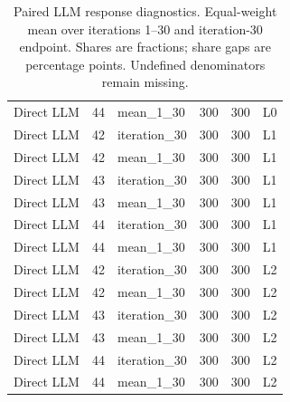 \begin{table}[htbp!]
\begin{tabular}{lrlrrl}
Direct LLM & 44 & mean\_1\_30 & 300 & 300 & L0 \\
Direct LLM & 42 & iteration\_30 & 300 & 300 & L1 \\
Direct LLM & 42 & mean\_1\_30 & 300 & 300 & L1 \\
Direct LLM & 43 & iteration\_30 & 300 & 300 & L1 \\
Direct LLM & 43 & mean\_1\_30 & 300 & 300 & L1 \\
Direct LLM & 44 & iteration\_30 & 300 & 300 & L1 \\
Direct LLM & 44 & mean\_1\_30 & 300 & 300 & L1 \\
Direct LLM & 42 & iteration\_30 & 300 & 300 & L2 \\
Direct LLM & 42 & mean\_1\_30 & 300 & 300 & L2 \\
Direct LLM & 43 & iteration\_30 & 300 & 300 & L2 \\
Direct LLM & 43 & mean\_1\_30 & 300 & 300 & L2 \\
Direct LLM & 44 & iteration\_30 & 300 & 300 & L2 \\
Direct LLM & 44 & mean\_1\_30 & 300 & 300 & L2 \\
\hline
\end{tabular}
\caption{Paired LLM response diagnostics. Equal-weight mean over iterations 1--30 and iteration-30 endpoint. Shares are fractions; share gaps are percentage points. Undefined denominators remain missing.}
\label{chap:results:tab:rq2_llm_valid_pairs}
\end{table}
